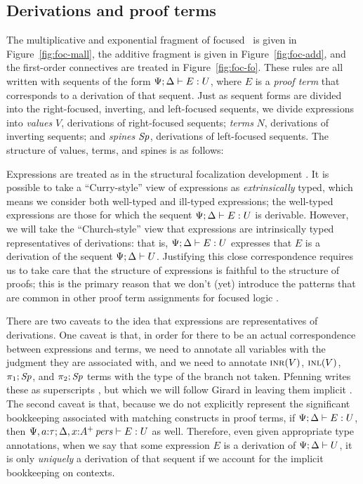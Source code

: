 \subsection{Derivations and proof terms}
\label{sec:ord-proof-terms}





The multiplicative and exponential fragment of focused \ollll~is given
in Figure~\ref{fig:foc-mall}, the additive fragment is given in
Figure~\ref{fig:foc-add}, and the first-order connectives are treated
in Figure~\ref{fig:foc-fo}. These rules are all written with sequents
of the form ${\Psi}; {\Delta} \vdash {E} : {U}$, where $E$ is a {\it proof
  term} that corresponds to a derivation of that sequent. Just
as sequent forms are divided into the right-focused, inverting, and
left-focused sequents, we divide expressions into {\it values} $V$,
derivations of right-focused sequents; {\it terms} $N$,
derivations of inverting sequents; and {\it spines} ${\it Sp}$,
derivations of left-focused sequents. The structure of
values, terms, and spines is as follows:


Expressions are treated as in the structural focalization development
\cite{simmons11structural}. It is possible to take a ``Curry-style''
view of expressions as {\it extrinsically} typed, which means we
consider both well-typed and ill-typed expressions; the well-typed
expressions are those for which the sequent
${\Psi}; {\Delta} \vdash {E} : {U}$ is derivable. However, we will take the
``Church-style'' view that expressions are intrinsically typed
representatives of derivations: that is, ${\Psi}; {\Delta} \vdash {E} : {U}$
expresses that $E$ is a derivation of the sequent
${\Psi};{\Delta} \vdash {U}$. Justifying this close correspondence requires
us to take care that the structure of expressions is faithful to the
structure of proofs; this is the primary reason that we don't (yet)
introduce the patterns that are common in other proof term assignments
for focused logic
\cite{watkins02concurrent,licata08focusing,krishnaswami09focusing}.

There are two caveats to the idea that expressions are representatives
of derivations. One caveat is that, in order for there to be an actual
correspondence between expressions and terms, we need to annotate all
variables with the judgment they are associated with, and we need to
annotate $\textsc{inr}({V})$, $\textsc{inl}({V})$, $\pi_1;{{\it Sp}}$, and $\pi_2;{{\it Sp}}$
terms with the type of the branch not taken. Pfenning writes these as
superscripts \cite{pfenning08church}, but which we will follow Girard
in leaving them implicit \cite{girard89proofs}. The second caveat is
that, because we do not explicitly represent the significant
bookkeeping associated with matching constructs in proof terms, if
${\Psi}; {\Delta} \vdash {E} : {U}$, then ${\Psi, a{:}\tau}; {\Delta,
  x{:}{A^+}\,{{\it pers}}} \vdash {E} : {U}$ as well. Therefore, even given appropriate
type annotations, when we say that some expression $E$ is a derivation
of ${\Psi};{\Delta} \vdash {U}$, it is only {\it uniquely} a derivation of
that sequent if we account for the implicit bookkeeping on contexts.

